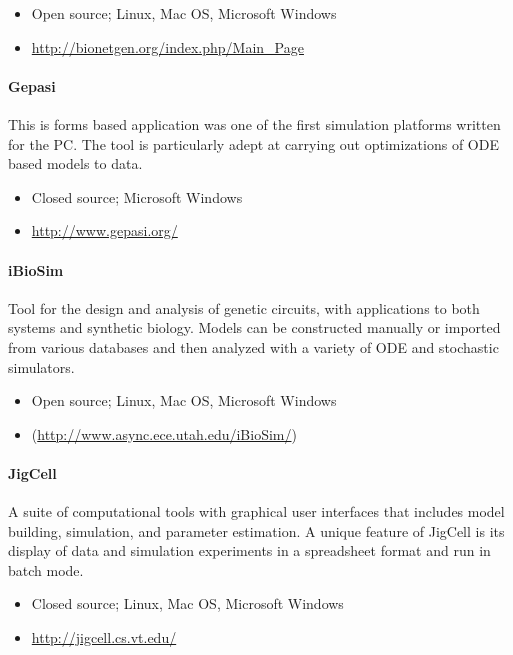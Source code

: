 \begin{itemize}
\item
  Open source; Linux, Mac OS, Microsoft Windows
\item
  \url{http://bionetgen.org/index.php/Main_Page}
\end{itemize}
\paragraph{Gepasi \autocite{Gepasi:1993}}

This is forms based application was one of the first simulation
platforms written for the PC. The tool is particularly adept at carrying
out optimizations of ODE based models to data.

\begin{itemize}
\item
  Closed source; Microsoft Windows
\item
  \url{http://www.gepasi.org/}
\end{itemize}
\paragraph{iBioSim \autocite{myers2009ibiosim}}

Tool for the design and analysis of genetic circuits, with applications
to both systems and synthetic biology. Models can be constructed
manually or imported from various databases and then analyzed with a
variety of ODE and stochastic simulators.

\begin{itemize}
\item
  Open source; Linux, Mac OS, Microsoft Windows
\item
  (\url{http://www.async.ece.utah.edu/iBioSim/})
\end{itemize}
\paragraph{JigCell \autocite{vass2004jigcell}
\autocite{vass2006jigcell}}

A suite of computational tools with graphical user interfaces that
includes model building, simulation, and parameter estimation. A unique
feature of JigCell is its display of data and simulation experiments in
a spreadsheet format and run in batch mode.

\begin{itemize}
\item
  Closed source; Linux, Mac OS, Microsoft Windows
\item
  \url{http://jigcell.cs.vt.edu/}
\end{itemize}
